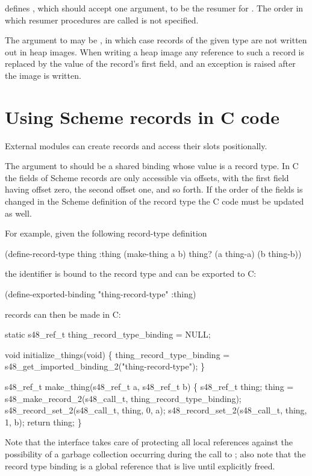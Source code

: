 \noindent{} defines ,
 which should accept one argument, to be the resumer for
 .
The order in which resumer procedures are called is not specified.

The  argument to  may
 be , in which case records of the given type are
 not written out in heap images.
When writing a heap image any reference to such a record is replaced by
 the value of the record's first field, and an exception is raised
 after the image is written.

\section{Using Scheme records in C code}

External modules can create records and access their slots
 positionally.

\begin{protos}
\end{protos}
%
The argument to  should be a shared binding
 whose value is a record type.
In C the fields of Scheme records are only accessible via offsets,
 with the first field having offset zero, the second offset one, and
 so forth.
If the order of the fields is changed in the Scheme definition of the
 record type the C code must be updated as well.

For example, given the following record-type definition
\begin{example}
(define-record-type thing :thing
  (make-thing a b)
  thing?
  (a thing-a)
  (b thing-b))
\end{example}
 the identifier  is bound to the record type and can
 be exported to C:
\begin{example}
(define-exported-binding "thing-record-type" :thing)
\end{example}
 records can then be made in C:
\begin{example}
static s48_ref_t
  thing_record_type_binding = NULL;

void initialize_things(void)
\{
  thing_record_type_binding =
     s48_get_imported_binding_2("thing-record-type");
\}

s48_ref_t make_thing(s48_ref_t a, s48_ref_t b)
\{
  s48_ref_t thing;
  thing = s48_make_record_2(s48_call_t, thing_record_type_binding);
  s48_record_set_2(s48_call_t, thing, 0, a);
  s48_record_set_2(s48_call_t, thing, 1, b);
  return thing;
\}
\end{example}
Note that the interface takes care of protecting all local references 
 against the possibility of a garbage collection occurring during
 the call to ; also note that the record
 type binding is a global reference that is live until explicitly
 freed.

